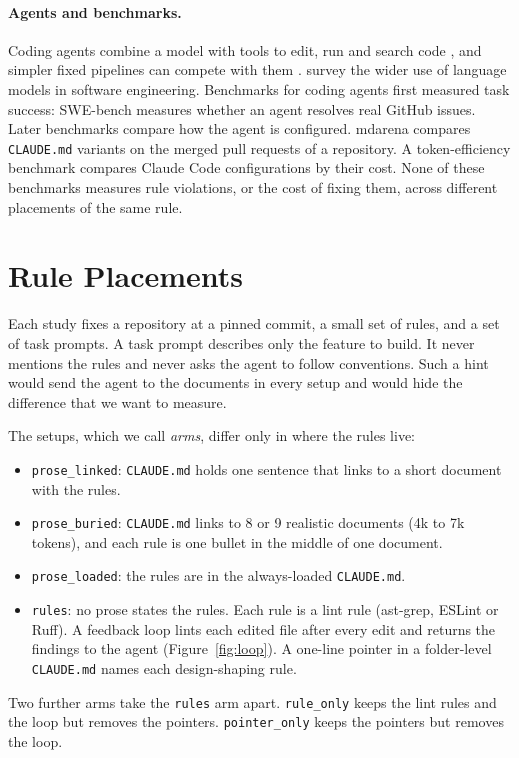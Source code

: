 \documentclass[pdflatex,sn-basic]{sn-jnl}
\newcommand{\file}[1]{\texttt{#1}}
\newcommand{\arm}[1]{\texttt{#1}}
\begin{document}
\paragraph{Agents and benchmarks.}
Coding agents combine a model with tools to edit, run and search code \citep{yang2024sweagent,wang2025openhands,zhang2024autocoderover}, and simpler fixed pipelines can compete with them \citep{xia2025agentless}.
\citet{hou2024llm4se} survey the wider use of language models in software engineering.
Benchmarks for coding agents first measured task success: SWE-bench \citep{jimenez2024swebench} measures whether an agent resolves real GitHub issues.
Later benchmarks compare how the agent is configured.
mdarena \citep{mdarena} compares \file{CLAUDE.md} variants on the merged pull requests of a repository.
A token-efficiency benchmark \citep{peker2026tokeneff} compares Claude Code configurations by their cost.
None of these benchmarks measures rule violations, or the cost of fixing them, across different placements of the same rule.

\section{Rule Placements}
\label{sec:setups}

Each study fixes a repository at a pinned commit, a small set of rules, and a set of task prompts.
A task prompt describes only the feature to build.
It never mentions the rules and never asks the agent to follow conventions.
Such a hint would send the agent to the documents in every setup and would hide the difference that we want to measure.

The setups, which we call \emph{arms}, differ only in where the rules live:
\begin{itemize}
\item \arm{prose\_linked}: \file{CLAUDE.md} holds one sentence that links to a short document with the rules.
\item \arm{prose\_buried}: \file{CLAUDE.md} links to 8 or 9 realistic documents (4k to 7k tokens), and each rule is one bullet in the middle of one document.
\item \arm{prose\_loaded}: the rules are in the always-loaded \file{CLAUDE.md}.
\item \arm{rules}: no prose states the rules.
Each rule is a lint rule (ast-grep, ESLint or Ruff).
A feedback loop lints each edited file after every edit and returns the findings to the agent (Figure~\ref{fig:loop}).
A one-line pointer in a folder-level \file{CLAUDE.md} names each design-shaping rule.
\end{itemize}
Two further arms take the \arm{rules} arm apart.
\arm{rule\_only} keeps the lint rules and the loop but removes the pointers.
\arm{pointer\_only} keeps the pointers but removes the loop.
\end{document}
